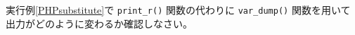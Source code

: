  \begin{Prob}\upshape\Must
  実行例\ref{PHPsubstitute}で \texttt{print\_r()} 関数の代わりに
   \texttt{var\_dump()} 関数を用いて出力がどのように変わるか確認しなさい。
 \end{Prob}
